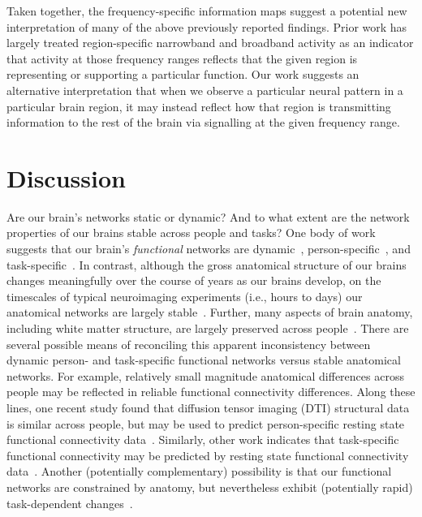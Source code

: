 \documentclass[11pt]{article}
\begin{document}
Taken together, the frequency-specific information maps suggest a potential new
interpretation of many of the above previously reported findings.  Prior work
has largely treated region-specific narrowband and broadband activity as an
indicator that activity at those frequency ranges reflects that the given region
is representing or supporting a particular function.  Our work suggests an
alternative interpretation that when we observe a particular neural pattern in a
particular brain region, it may instead reflect how that region is 
transmitting information to the rest of the brain via signalling at the given
frequency range.

\section*{Discussion}
Are our brain's networks static or dynamic?  And to what
extent are the network properties of our brains stable across people and tasks?
One body of work suggests that our brain's \textit{functional} networks are
dynamic~\citep[e.g., ][]{MannEtal18, OwenEtal19}, person-specific~\citep[e.g.,
][]{FinnEtal15}, and task-specific~\citep[e.g., ][]{Turk13}.  In contrast,
although the gross anatomical structure of our brains changes meaningfully over
the course of years as our brains develop, on the timescales of typical
neuroimaging experiments (i.e., hours to days) our anatomical networks are
largely stable~\citep[e.g., ][]{CaseEtal00}.  Further, many aspects of brain
anatomy, including white matter structure, are largely preserved across
people~\citep[e.g., ][]{TalaTour88, JahaEtal13, MoriEtal08}. There are several
possible means of reconciling this apparent inconsistency between dynamic
person- and task-specific functional networks versus stable anatomical networks.
For example, relatively small magnitude anatomical differences across people may
be reflected in reliable functional connectivity differences.  Along these
lines, one recent study found that diffusion tensor imaging (DTI) structural
data is similar across people, but may be used to predict person-specific
resting state functional connectivity data~\citep{BeckEtal18}.  Similarly, other
work indicates that task-specific functional connectivity may be predicted by
resting state functional connectivity data~\citep{ColeEtal16, TavoEtal16}.
Another (potentially complementary) possibility is that our functional networks
are constrained by anatomy, but nevertheless exhibit (potentially rapid)
task-dependent changes~\citep[e.g., ][]{SporBetz16}.
\end{document}
